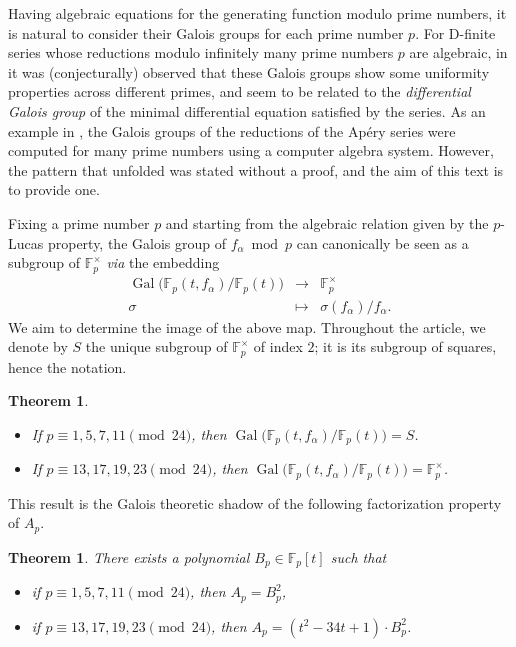 \documentclass{article}
\newcommand{\F}{\mathbb{F}}
\newcommand{\Fp}{\mathbb{F}_p}
\DeclareMathOperator{\Gal}{Gal}
\theoremstyle{definition}
\theoremstyle{plain}
\newtheorem{thm}[defi]{Theorem}
\theoremstyle{remark}
\begin{document}
Having algebraic equations for the generating function modulo prime numbers, it is natural to consider their Galois groups for each prime number $p$. For D-finite series whose reductions modulo infinitely many prime numbers $p$ are algebraic, in   \cite{CFV25} it was (conjecturally) observed that these Galois groups show some uniformity properties across different primes, and seem to be related to the \emph{differential Galois group} of the minimal differential equation satisfied by the series. As an example in \cite[\S~2.1.5]{CFV25}, the Galois groups of the reductions of the Apéry series were computed for many prime numbers using a computer algebra system. However, the pattern that unfolded was stated without a proof, and the aim of this text is to provide one.

Fixing a prime number $p$ and starting from the algebraic relation given by the $p$-Lucas property, the Galois group of $f_\alpha \bmod p$ can canonically be 
seen as a subgroup of $\F_p^\times$ \emph{via} the embedding
$$\begin{array}{rcl}
\Gal\big(\F_p(t,f_\alpha)/\F_p(t)\big) & \longrightarrow & \F_p^\times \\
\sigma & \mapsto & \sigma(f_\alpha)/f_\alpha.
\end{array}$$
We aim to determine the image of the above map.
Throughout the article, we denote by $S$ the unique subgroup of $\F_p^\times$ of index $2$; it is its subgroup of squares, hence the notation.

\begin{thm}~
\label{thm:apery}
\begin{itemize}
\item If $p \equiv 1, 5, 7, 11 \pmod{24}$, then
$\Gal\big(\F_p(t, f_\alpha)/\F_p(t)\big) = S$.

\item If $p \equiv 13, 17, 19, 23 \pmod{24}$, then
$\Gal\big(\F_p(t, f_\alpha)/\F_p(t)\big) = \F_p^\times$.
\end{itemize}
\end{thm}

\noindent
This result is the Galois theoretic shadow of the following
factorization property of $A_p$.

\begin{thm}
\label{thm:Ap}
There exists a polynomial $B_p \in \Fp[t]$ such that
\begin{itemize}
\item if $p \equiv 1, 5, 7, 11 \pmod{24}$, then $A_p = B_p^2$,
\item if $p \equiv 13, 17, 19, 23 \pmod{24}$, then $A_p = (t^2 - 34t + 1) \cdot B_p^2$.
\end{itemize}
\end{thm}
\end{document}
